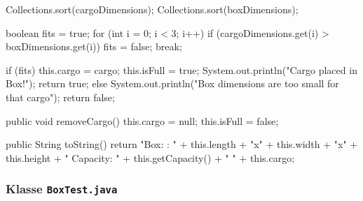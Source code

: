 \documentclass[a4paper,10pt, dvipsnames]{report}
\begin{document}
\begin{javacodebox}
{{{            Collections.sort(cargoDimensions);
            Collections.sort(boxDimensions);
            
            boolean fits = true;
            for (int i = 0; i < 3; i++) {
                if (cargoDimensions.get(i) > boxDimensions.get(i)) {
                    fits = false;
                    break;
                }
            }

            if (fits) {
                this.cargo = cargo;
                this.isFull = true;
                System.out.println("Cargo placed in Box!");
                return true;
            } else {
                System.out.println("Box dimensions are too small for that cargo");
                return false;
            }

            
        }
    }

    public void removeCargo() {
        this.cargo = null;
        this.isFull = false;
    }

    public String toString() {
        return "Box: \tDimensions: " + this.length + "x" + this.width + "x" + this.height + " Capacity: " + this.getCapacity() + " " + this.cargo;
    }
}
\end{javacodebox}

\subsubsection{Klasse \texttt{BoxTest.java}}
\end{document}
